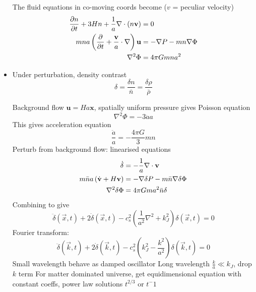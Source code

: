 \begin{itemize}
The fluid equations in co-moving coords become ($v$ = peculiar velocity)
\begin{align*}
    \frac{\partial{n }}{\partial{t}} +3Hn+ \frac{1}{a} \nabla\cdot(n \mathbf{v}) &= 0 \\
    mna \left( \frac{\partial{}}{\partial{t}} + \frac{\mathbf{v}}{a} \cdot \nabla\right) \mathbf{u} &= -\mathbf{\nabla} P - mn \mathbf{\nabla} \Phi \\
    \nabla^2 \Phi &= 4\pi G mna^2
\end{align*}
\item Under perturbation, density contrast \[\delta = \frac{\delta n}{\bar{n}} = \frac{\delta \rho}{\bar{\rho}} \] 

Background flow $\mathbf{u} = H a \mathbf{x}$, spatially uniform pressure gives Poisson equation \[\nabla^2 \Phi = -3\ddot{a}a \]
This gives acceleration equation \[\frac{\ddot{a}}{a} = -\frac{4\pi G}{3}mn\]
Perturb from background flow: linearised equations
\begin{align*}
    \dot{\delta} &= -\frac{1}{a}\nabla\cdot\mathbf{v} \\
    m\bar{n}a \left( \dot{\mathbf{v}}  + H\mathbf{v}\right) &= -\mathbf{\nabla} \delta P - m \bar{n} \mathbf{\nabla} \delta \Phi \\
    \nabla^2 \delta \Phi &= 4\pi G m a^2 \bar{n}\delta 
\end{align*}
Combining to give \[\ddot{\delta}(\vec{x},t) + 2\dot{\delta}(\vec{x},t) -c_s^2 \left(\frac{1}{a^2}\nabla^2 + k_J^2\right)\delta (\vec{x},t)= 0\]
Fourier transform: \[\ddot{\delta}(\vec{k},t) + 2\dot{\delta}(\vec{k},t) -c_s^2 \left(k_J^2 - \frac{k^2}{a^2}\right)\delta (\vec{k},t)= 0\]
Small wavelength behave as damped oscillator
Long wavelength $\frac{k}{a} \ll k_J$, drop $k$ term
For matter dominated universe, get equidimensional equation with constant coeffs, power law solutions $t^{2/3}$ or $t^-1$
\end{itemize}
